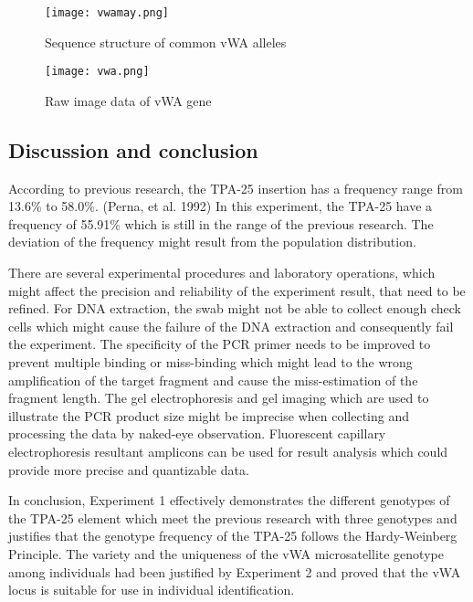 \documentclass[a4paper,10pt]{article}
\begin{document}
\begin{figure}[H]
\centering
\texttt{[image: vwamay.png]}
\caption{Sequence structure of common vWA alleles} \label{fig3}
\end{figure}







\begin{figure}[H]
\centering
\texttt{[image: vwa.png]}
\caption{Raw image data of vWA gene} \label{fig3}
\end{figure}



\begin{multicols}{2}
\section{Discussion and conclusion}

According to previous research, the TPA-25 insertion has a frequency range from 13.6\% to 58.0\%. (Perna, et al. 1992) In this experiment, the TPA-25 have a frequency of 55.91\% which is still in the range of the previous research. The deviation of the frequency might result from the population distribution.

There are several experimental procedures and laboratory operations, which might affect the precision and reliability of the experiment result, that need to be refined. For DNA extraction, the swab might not be able to collect enough check cells which might cause the failure of the DNA extraction and consequently fail the experiment. The specificity of the PCR primer needs to be improved to prevent multiple binding or miss-binding which might lead to the wrong amplification of the target fragment and cause the miss-estimation of the fragment length. The gel electrophoresis and gel imaging which are used to illustrate the PCR product size might be imprecise when collecting and processing the data by naked-eye observation. Fluorescent capillary electrophoresis resultant amplicons can be used for result analysis which could provide more precise and quantizable data.

In conclusion, Experiment 1 effectively demonstrates the different genotypes of the TPA-25 element which meet the previous research with three genotypes and justifies that the genotype frequency of the TPA-25 follows the Hardy-Weinberg Principle. The variety and the uniqueness of the vWA microsatellite genotype among individuals had been justified by Experiment 2 and proved that the vWA locus is suitable for use in individual identification.





\end{multicols}
\end{document}
